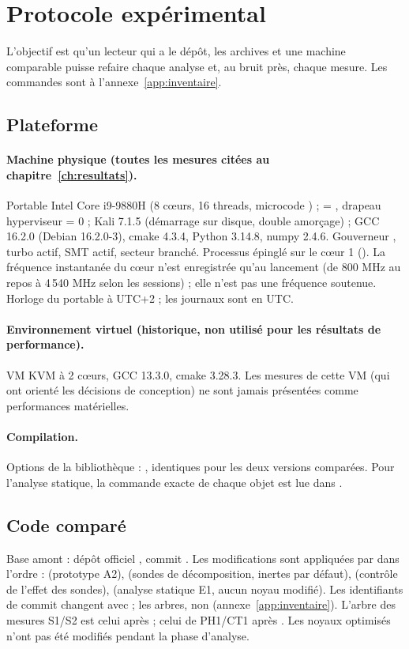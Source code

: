 \section{Protocole expérimental}\label{sec:protocole}
L'objectif est qu'un lecteur qui a le dépôt, les archives et une machine comparable puisse refaire chaque analyse et, au bruit près, chaque mesure. Les commandes sont à l'annexe~\ref{app:inventaire}.

\subsection{Plateforme}
\paragraph{Machine physique (toutes les mesures citées au chapitre~\ref{ch:resultats}).} Portable Intel Core i9-9880H (8 cœurs, 16 threads, microcode ) ;  = , drapeau hyperviseur = 0 ; Kali 7.1.5 (démarrage sur disque, double amorçage) ; GCC 16.2.0 (Debian 16.2.0-3), cmake 4.3.4, Python 3.14.8, numpy 2.4.6. Gouverneur , turbo actif, SMT actif, secteur branché. Processus épinglé sur le cœur 1 (). La fréquence instantanée du cœur n'est enregistrée qu'au lancement (de 800 MHz au repos à 4\,540 MHz selon les sessions) ; elle n'est pas une fréquence soutenue. Horloge du portable à UTC+2 ; les journaux  sont en UTC.

\paragraph{Environnement virtuel (historique, non utilisé pour les résultats de performance).} VM KVM à 2 cœurs, GCC 13.3.0, cmake 3.28.3. Les mesures de cette VM (qui ont orienté les décisions de conception) ne sont jamais présentées comme performances matérielles.

\paragraph{Compilation.} Options de la bibliothèque : , identiques pour les deux versions comparées. Pour l'analyse statique, la commande exacte de chaque objet est lue dans .

\subsection{Code comparé}
Base amont : dépôt officiel , commit . Les modifications sont appliquées par  dans l'ordre :  (prototype A2),  (sondes de décomposition, inertes par défaut),  (contrôle de l'effet des sondes),  (analyse statique E1, aucun noyau modifié). Les identifiants de commit changent avec  ; les arbres, non (annexe~\ref{app:inventaire}). L'arbre des mesures S1/S2 est celui après  ; celui de PH1/CT1 après . Les noyaux optimisés n'ont pas été modifiés pendant la phase d'analyse.

